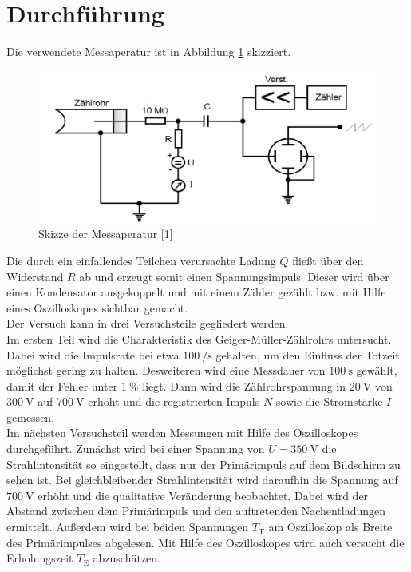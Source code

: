 \section{Durchführung}
\label{sec:Durchführung}

Die verwendete Messaperatur ist in Abbildung \ref{fig:Aufbau} skizziert. 

\begin{figure}
  \centering
  \includegraphics[scale=0.3]{content/Aufbau.png}
  \caption{Skizze der Messaperatur [1]}
  \label{fig:Aufbau}
\end{figure}

Die durch ein einfallendes Teilchen verursachte Ladung $Q$ fließt über den Widerstand $R$
ab und erzeugt somit einen Spannungsimpuls. Dieser wird über einen Kondensator 
ausgekoppelt und mit einem Zähler gezählt bzw. mit Hilfe eines Oszilloskopes sichtbar
gemacht. \\
Der Versuch kann in drei Versuchsteile gegliedert werden. \\

Im ersten Teil wird die Charakteristik des Geiger-Müller-Zählrohrs untersucht. Dabei 
wird die Impulsrate bei etwa $\SI{100}{\per\second}$ gehalten, um den Einfluss der 
Totzeit möglichst gering zu halten. Desweiteren wird eine Messdauer von $\SI{100}{\second}$
gewählt, damit der Fehler unter $\SI{1}{\percent}$ liegt. Dann wird die Zählrohrspannung
in $\SI{20}{\volt}$ von $\SI{300}{\volt}$ auf $\SI{700}{\volt}$ erhöht und die 
registrierten Impuls $N$ sowie die Stromstärke $I$ gemessen. \\

Im nächsten Versuchsteil werden Messungen mit Hilfe des Oszilloskopes durchgeführt. 
Zunächst wird bei einer Spannung von $U = \SI{350}{\volt}$ die Strahlintensität so 
eingestellt, dass nur der Primärimpuls auf dem Bildschirm zu sehen ist. Bei 
gleichbleibender Strahlintensität wird daraufhin die Spannung auf $\SI{700}{\volt}$
erhöht und die qualitative Veränderung beobachtet. Dabei wird der Abstand zwischen
dem Primärimpuls und den auftretenden Nachentladungen ermittelt. Außerdem wird bei 
beiden Spannungen $T_\text{T}$ am Oszilloskop als Breite des Primärimpulses 
abgelesen. Mit Hilfe des Oszilloskopes wird auch versucht die Erholungszeit $T_\text{E}$
abzuschätzen. \\

